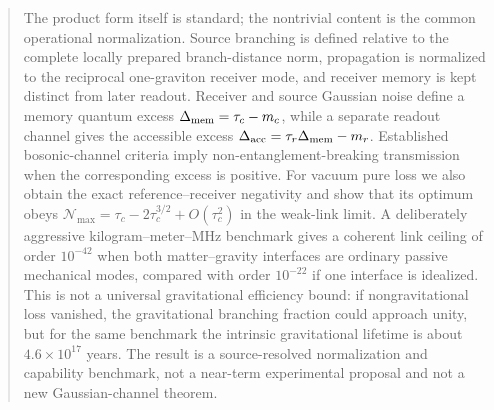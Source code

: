 \documentclass[11pt]{article}
\begin{document}
\begin{abstract}
The product form itself is standard; the nontrivial content is the common operational normalization. Source branching is defined relative to the complete locally prepared branch-distance norm, propagation is normalized to the reciprocal one-graviton receiver mode, and receiver memory is kept distinct from later readout. Receiver and source Gaussian noise define a memory quantum excess $\Delta_{\rm mem}=\tau_c-m_c$, while a separate readout channel gives the accessible excess $\Delta_{\rm acc}=\tau_r\Delta_{\rm mem}-m_r$. Established bosonic-channel criteria imply non-entanglement-breaking transmission when the corresponding excess is positive. For vacuum pure loss we also obtain the exact reference--receiver negativity and show that its optimum obeys $\mathcal N_{\max}=\tau_c-2\tau_c^{3/2}+O(\tau_c^2)$ in the weak-link limit. A deliberately aggressive kilogram--meter--MHz benchmark gives a coherent link ceiling of order $10^{-42}$ when both matter--gravity interfaces are ordinary passive mechanical modes, compared with order $10^{-22}$ if one interface is idealized. This is not a universal gravitational efficiency bound: if nongravitational loss vanished, the gravitational branching fraction could approach unity, but for the same benchmark the intrinsic gravitational lifetime is about $4.6\times10^{17}$ years. The result is a source-resolved normalization and capability benchmark, not a near-term experimental proposal and not a new Gaussian-channel theorem.
\end{abstract}














\end{document}
